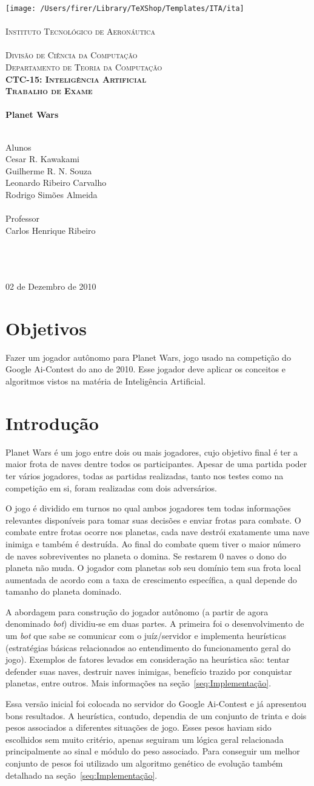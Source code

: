\documentclass[a4paper,titlepage,11pt]{article}
\newcommand{\mydivision}{Divisão de Ciência da Computação\\Departamento de Teoria da Computação}
\newcommand{\mydiscipline}{CTC-15: Inteligência Artificial}
\newcommand{\mysupertitle}{Trabalho de Exame}
\newcommand{\mytitle}{Planet Wars}
\newcommand{\myname}{Cesar R. Kawakami\\Guilherme R. N. Souza\\Leonardo Ribeiro Carvalho\\Rodrigo Simões Almeida}
\newcommand{\myfieldAname}{Alunos}
\newcommand{\myfieldAcontent}{\myname}
\newcommand{\myfieldBname}{Professor}
\newcommand{\myfieldBcontent}{Carlos Henrique Ribeiro}
\newcommand{\myfieldCname}{\ }
\newcommand{\myfieldCcontent}{\ }
\newcommand{\mydate}{02 de Dezembro de 2010}
\renewcommand{\maketitle}{%
 	\begin{titlepage}
		\begin{center}
			\texttt{[image: /Users/firer/Library/TeXShop/Templates/ITA/ita]}\\
			\ \\ %
			\textsc{%
				\Large Instituto Tecnológico de Aeronáutica\\
				\large%
				\ \\
				\mydivision\\
				\textbf{\mydiscipline}\\
			}
			\vspace{2cm}
			\textbf{%
				\textsc{\large \mysupertitle}\\
				\ \\
				\huge \mytitle\\
				\ \\
			}
			\vspace{2cm}
			\begin{flushleft}
				\large \myfieldAname\\
				\Large \myfieldAcontent\\
				\ \\
				\large \myfieldBname\\
				\Large \myfieldBcontent\\
				\ \\
				\large \myfieldCname\\
				\Large \myfieldCcontent\\
			\end{flushleft}
			\vfill
			{\large \mydate}
		\end{center}		
	\end{titlepage}
}
\begin{document}
\maketitle

\section{Objetivos}

Fazer um jogador autônomo para Planet Wars, jogo usado na competição do Google Ai-Contest do ano de 2010. Esse jogador deve aplicar os conceitos e algoritmos vistos na matéria de Inteligência Artificial.

\section{Introdução}
Planet Wars é um jogo entre dois ou mais jogadores, cujo objetivo final é ter a maior frota de naves dentre todos os participantes. Apesar de uma partida poder ter vários jogadores, todas as partidas realizadas, tanto nos testes como na competição em si, foram realizadas com dois adversários. 

O jogo é dividido em turnos no qual ambos jogadores tem todas informações relevantes disponíveis para tomar suas decisões e enviar frotas para combate. O combate entre frotas ocorre nos planetas, cada nave destrói exatamente uma nave inimiga e também é destruída. Ao final do combate quem tiver o maior número de naves sobreviventes no planeta o domina. Se restarem 0 naves o dono do planeta não muda. O jogador com planetas sob seu domínio tem sua frota local aumentada de acordo com a taxa de crescimento específica, a qual depende do tamanho do planeta dominado.

A abordagem para construção do jogador autônomo (a partir de agora denominado {\em bot}) dividiu-se em duas partes. A primeira foi o desenvolvimento de um {\em bot} que sabe se comunicar com o juíz/servidor e implementa heurísticas (estratégias básicas relacionados ao entendimento do funcionamento geral do jogo). Exemplos de fatores levados em consideração na heurística são: tentar defender suas naves, destruir naves inimigas, benefício trazido por conquistar planetas, entre outros. Mais informações na seção~\ref{seq:Implementação}.

Essa versão inicial foi colocada no servidor do Google Ai-Contest e já apresentou bons resultados. A heurística, contudo, dependia de um conjunto de trinta e dois pesos associados a diferentes situações de jogo. Esses pesos haviam sido escolhidos sem muito critério, apenas seguiram um lógica geral relacionada principalmente ao sinal e módulo do peso associado. Para conseguir um melhor conjunto de pesos foi utilizado um algoritmo genético de evolução também detalhado na seção~\ref{seq:Implementação}.
\end{document}
